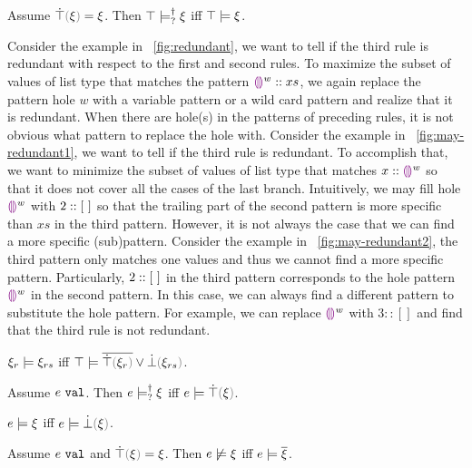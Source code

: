 \documentclass[runningheads,envcountsame,a4paper]{llncs}
\begin{document}
\begin{lemma}
  Assume $\ctruify{\xi}=\xi$. Then $\top \models_{?}^{\dag} \xi$ iff $\top \models \xi$.
\end{lemma}

Consider the example in \figurename~\ref{fig:redundant}, we want to tell if the third rule is redundant with respect to the first and second rules. To maximize the subset of values of list type that matches the pattern $\textcolor{violet}{\llparenthesis}\textcolor{violet}{\rrparenthesis}^{w}::xs$, we again replace the pattern hole $w$ with a variable pattern or a wild card pattern and realize that it is redundant. When there are hole(s) in the patterns of preceding rules, it is not obvious what pattern to replace the hole with. Consider the example in \figurename~\ref{fig:may-redundant1}, we want to tell if the third rule is redundant. To accomplish that, we want to minimize the subset of values of list type that matches $x::\textcolor{violet}{\llparenthesis}\textcolor{violet}{\rrparenthesis}^{w}$ so that it does not cover all the cases of the last branch. Intuitively, we may fill hole $\textcolor{violet}{\llparenthesis}\textcolor{violet}{\rrparenthesis}^{w}$ with $2::[~]$ so that the trailing part of the second pattern is more specific than $xs$ in the third pattern. However, it is not always the case that we can find a more specific (sub)pattern. Consider the example in \figurename~\ref{fig:may-redundant2}, the third pattern only matches one values and thus we cannot find a more specific pattern. Particularly, $2::[~]$ in the third pattern corresponds to the hole pattern $\textcolor{violet}{\llparenthesis}\textcolor{violet}{\rrparenthesis}^{w}$ in the second pattern. In this case, we can always find a different pattern to substitute the hole pattern. For example, we can replace $\textcolor{violet}{\llparenthesis}\textcolor{violet}{\rrparenthesis}^{w}$ with $3::[]$ and find that the third rule is not redundant.
\begin{theorem}
  $\xi_r \models \xi_{rs}$ iff $\csatisfy{\ctruth}{\cor{\cdual{\ctruify{\xi_r}}}{\cfalsify{\xi_{rs}}}}$.
\end{theorem}

\begin{lemma}
  Assume $e ~\mathtt{val}$. Then $e \models_{?}^{\dag} \xi$ iff $\csatisfy{e}{\ctruify{\xi}}$.
\end{lemma}

\begin{lemma}
  $e \models \xi$ iff $\csatisfy{e}{\cfalsify{\xi}}$.
\end{lemma}

\begin{lemma}
  Assume $e ~\mathtt{val}$ and $\ctruify{\xi}=\xi$. Then $e \not\models \xi$ iff $e \models \overline{\xi}$.
\end{lemma}
\end{document}
